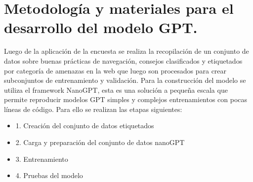 \section{Metodología y materiales para el desarrollo del modelo GPT.}\label{section:Metodología y materiales para el desarrollo del modelo GPT} 
Luego de la aplicación de la encuesta se realiza la recopilación de un conjunto de datos sobre buenas prácticas de navegación, consejos clasificados y etiquetados por categoría de amenazas en la web que luego son procesados para crear subconjuntos de entrenamiento y validación.
Para la construcción del modelo se utiliza el framework NanoGPT, esta es una solución a pequeña escala que permite reproducir modelos GPT simples y complejos entrenamientos con pocas líneas de código. \cite{Yang2020}
Para ello se realizan las etapas siguientes:
 \begin{itemize}
        \item 1.    Creación del conjunto de datos etiquetados
        \item 2.	Carga y preparación del conjunto de datos nanoGPT
        \item 3.	Entrenamiento
        \item 4.	Pruebas del modelo
    \end{itemize}

